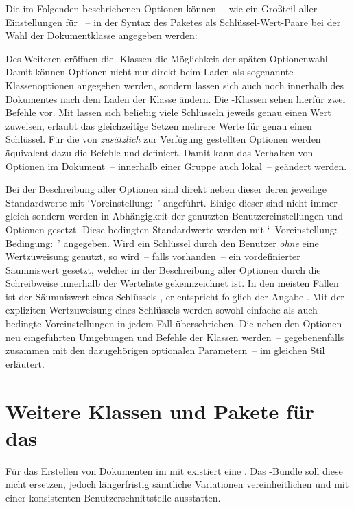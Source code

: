 Die im Folgenden beschriebenen Optionen können~-- wie ein Großteil aller 
Einstellungen für \KOMAScript~-- in der Syntax des Paketes  
als Schlüssel-Wert-Paare bei der Wahl der Dokumentklasse angegeben werden:

Des Weiteren eröffnen die \KOMAScript-Klassen die Möglichkeit der späten 
Optionenwahl. Damit können Optionen nicht nur direkt beim Laden als sogenannte 
Klassenoptionen angegeben werden, sondern lassen sich auch noch innerhalb des 
Dokumentes nach dem Laden der Klasse ändern. Die \KOMAScript-Klassen sehen 
hierfür zwei Befehle vor. Mit 
lassen sich beliebig viele Schlüsseln jeweils genau einen Wert zuweisen, 
erlaubt das gleichzeitige Setzen mehrere Werte für genau einen Schlüssel. 
Für die von \TUDScript \emph{zusätzlich} zur Verfügung gestellten Optionen
werden äquivalent dazu die Befehle 
und  definiert. 
Damit kann das Verhalten von Optionen im Dokument~-- innerhalb einer Gruppe 
auch lokal~-- geändert werden.

Bei der Beschreibung aller Optionen sind direkt neben dieser deren jeweilige 
Standardwerte mit \mbox{\enquote*{Voreinstellung: }} angeführt. 
Einige dieser sind nicht immer gleich sondern werden in Abhängigkeit der 
genutzten Benutzereinstellungen und Optionen gesetzt. Diese bedingten 
Standardwerte werden mit 
\mbox{\enquote*{%
  Voreinstellung: \,\textbar\,Bedingung: %
}}
angegeben. Wird ein Schlüssel durch den Benutzer \emph{ohne} eine Wertzuweisung 
genutzt, so wird~-- falls vorhanden~-- ein vordefinierter Säumniswert gesetzt, 
welcher in der Beschreibung aller Optionen durch die~ 
Schreibweise innerhalb der Werteliste gekennzeichnet ist. In den meisten Fällen 
ist der Säumniswert eines Schlüssels , er entspricht folglich der 
Angabe . Mit der expliziten Wertzuweisung eines 
Schlüssels werden sowohl einfache als auch bedingte Voreinstellungen in jedem 
Fall überschrieben. Die neben den Optionen neu eingeführten Umgebungen und 
Befehle der Klassen werden~-- gegebenenfalls zusammen mit den dazugehörigen 
optionalen Parametern~-- im gleichen Stil erläutert.



\section{%
  Weitere Klassen und Pakete für das \CD%
  \label{sec:tudclasses}%
}
Für das Erstellen von Dokumenten im \TUDCD mit  existiert eine 
. Das 
\TUDScript-Bundle soll diese nicht ersetzen, jedoch längerfristig sämtliche 
Variationen vereinheitlichen und mit einer konsistenten Benutzerschnittstelle 
ausstatten. 

